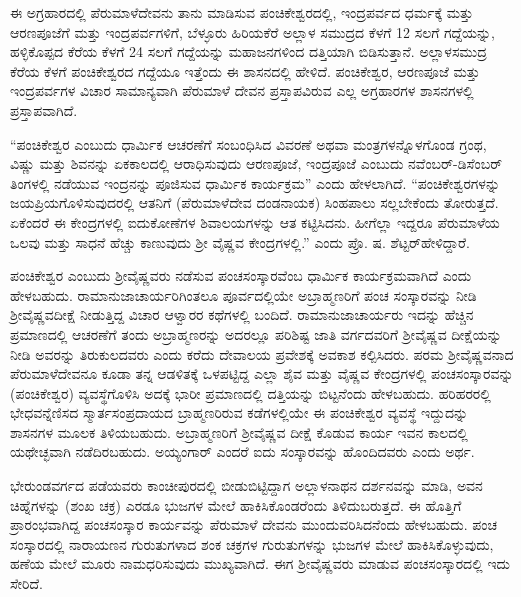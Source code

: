 ಈ ಅಗ್ರಹಾರದಲ್ಲಿ ಪೆರುಮಾಳೆದೇವನು ತಾನು ಮಾಡಿಸುವ ಪಂಚಿಕೇಶ್ವರದಲ್ಲಿ, ಇಂದ್ರಪರ್ವದ ಧರ್ಮಕ್ಕೆ ಮತ್ತು ಆರಣಪೂಜೆಗೆ ಮತ್ತು ಇಂದ್ರಪರ್ವಗಳಿಗೆ, ಬೆಳ್ಳೂರು ಹಿರಿಯಕೆರೆ ಅಲ್ಲಾಳ ಸಮುದ್ರದ ಕೆಳಗೆ 12 ಸಲಗೆ ಗದ್ದೆಯನ್ನು, ಹಳ್ಳಿಕೊಪ್ಪದ ಕೆರೆಯ ಕೆಳಗೆ 24 ಸಲಗೆ ಗದ್ದೆಯನ್ನು ಮಹಾಜನಗಳಿಂದ ದತ್ತಿಯಾಗಿ ಬಿಡಿಸುತ್ತಾನೆ. ಅಲ್ಲಾಳಸಮುದ್ರ ಕೆರೆಯ ಕೆಳಗೆ ಪಂಚಿಕೇಶ್ವರದ ಗದ್ದೆಯೂ ಇತ್ತೆಂದು ಈ ಶಾಸನದಲ್ಲಿ ಹೇಳಿದೆ. ಪಂಚಿಕೇಶ್ವರ, ಆರಣಪೂಜೆ ಮತ್ತು ಇಂದ್ರಪರ್ವಗಳ ವಿಚಾರ ಸಾಮಾನ್ಯವಾಗಿ ಪೆರುಮಾಳೆ ದೇವನ ಪ್ರಸ್ತಾಪವಿರುವ ಎಲ್ಲ ಅಗ್ರಹಾರಗಳ ಶಾಸನಗಳಲ್ಲಿ ಪ್ರಸ್ತಾಪವಾಗಿದೆ.

“ಪಂಚಿಕೇಶ್ವರ ಎಂಬುದು ಧಾರ್ಮಿಕ ಆಚರಣೆಗೆ ಸಂಬಂಧಿಸಿದ ವಿವರಣೆ ಅಥವಾ ಮಂತ್ರಗಳನ್ನೊಳಗೊಂಡ ಗ್ರಂಥ, ವಿಷ್ಣು ಮತ್ತು ಶಿವನನ್ನು ಏಕಕಾಲದಲ್ಲಿ ಆರಾಧಿಸುವುದು ಆರಣಪೂಜೆ, ಇಂದ್ರಪೂಜೆ ಎಂಬುದು ನವೆಂಬರ್​-ಡಿಸೆಂಬರ್​ ತಿಂಗಳಲ್ಲಿ ನಡೆಯುವ ಇಂದ್ರನನ್ನು ಪೂಜಿಸುವ ಧಾರ್ಮಿಕ ಕಾರ್ಯಕ್ರಮ” ಎಂದು ಹೇಳಲಾಗಿದೆ. “ಪಂಚಿಕೇಶ್ವರಗಳನ್ನು ಜಯಪ್ರಿಯಗೊಳಿಸುವುದರಲ್ಲಿ ಆತನಿಗೆ (ಪೆರುಮಾಳೆದೇವ ದಂಡನಾಯಕ) ಸಿಂಹಪಾಲು ಸಲ್ಲಬೇಕೆಂದು ತೋರುತ್ತದೆ. ಏಕೆಂದರೆ ಈ ಕೇಂದ್ರಗಳಲ್ಲಿ ಐದುಕೋಣೆಗಳ ಶಿವಾಲಯಗಳನ್ನು ಆತ ಕಟ್ಟಿಸಿದನು. ಹೀಗೆಲ್ಲಾ ಇದ್ದರೂ ಪೆರುಮಾಳೆಯ ಒಲವು ಮತ್ತು ಸಾಧನೆ ಹೆಚ್ಚು ಕಾಣುವುದು ಶ‍್ರೀ ವೈಷ್ಣವ ಕೇಂದ್ರಗಳಲ್ಲಿ.” ಎಂದು ಪ್ರೊ. ಷ. ಶೆಟ್ಟರ್​ ಹೇಳಿದ್ದಾರೆ.

ಪಂಚಿಕೇಶ್ವರ ಎಂಬುದು ಶ‍್ರೀವೈಷ್ಣವರು ನಡೆಸುವ ಪಂಚಸಂಸ್ಕಾರವೆಂಬ ಧಾರ್ಮಿಕ ಕಾರ್ಯಕ್ರಮವಾಗಿದೆ ಎಂದು ಹೇಳಬಹುದು. ರಾಮಾನುಜಾಚಾರ್ಯರಿಗಿಂತಲೂ ಪೂರ್ವದಲ್ಲಿಯೇ ಅಬ್ರಾಹ್ಮಣರಿಗೆ ಪಂಚ ಸಂಸ್ಕಾರವನ್ನು ನೀಡಿ ಶ‍್ರೀವೈಷ್ಣವದೀಕ್ಷೆ ನೀಡುತ್ತಿದ್ದ ವಿಚಾರ ಆಳ್ವಾರರ ಕಥೆಗಳಲ್ಲಿ ಬಂದಿದೆ. ರಾಮಾನುಜಾಚಾರ್ಯರು ಇದನ್ನು ಹೆಚ್ಚಿನ ಪ್ರಮಾಣದಲ್ಲಿ ಆಚರಣೆಗೆ ತಂದು ಅಬ್ರಾಹ್ಮಣರನ್ನು ಅದರಲ್ಲೂ ಪರಿಶಿಷ್ಟ ಜಾತಿ ವರ್ಗದವರಿಗೆ ಶ‍್ರೀವೈಷ್ಣವ ದೀಕ್ಷೆಯನ್ನು ನೀಡಿ ಅವರನ್ನು ತಿರುಕುಲದವರು ಎಂದು ಕರೆದು ದೇವಾಲಯ ಪ್ರವೇಶಕ್ಕೆ ಅವಕಾಶ ಕಲ್ಪಿಸಿದರು. ಪರಮ ಶ‍್ರೀವೈಷ್ಣವನಾದ ಪೆರುಮಾಳೆದೇವನೂ ಕೂಡಾ ತನ್ನ ಆಡಳಿತಕ್ಕೆ ಒಳಪಟ್ಟಿದ್ದ ಎಲ್ಲಾ ಶೈವ ಮತ್ತು ವೈಷ್ಣವ ಕೇಂದ್ರಗಳಲ್ಲಿ ಪಂಚಸಂಸ್ಕಾರವನ್ನು (ಪಂಚಿಕೇಶ್ವರ) ವ್ಯವಸ್ಥೆಗೊಳಿಸಿ ಅದಕ್ಕೆ ಭಾರೀ ಪ್ರಮಾಣದಲ್ಲಿ ದತ್ತಿಯನ್ನು ಬಿಟ್ಟನೆಂದು ಹೇಳಬಹುದು. ಹರಿಹರರಲ್ಲಿ ಭೇಧವನ್ನೆಣಿಸದ ಸ್ಮಾರ್ತಸಂಪ್ರದಾಯದ ಬ್ರಾಹ್ಮಣರಿರುವ ಕಡೆಗಳಲ್ಲಿಯೇ ಈ ಪಂಚಿಕೇಶ್ವರ ವ್ಯವಸ್ಥೆ ಇದ್ದುದನ್ನು ಶಾಸನಗಳ ಮೂಲಕ ತಿಳಿಯಬಹುದು. ಅಬ್ರಾಹ್ಮಣರಿಗೆ ಶ‍್ರೀವೈಷ್ಣವ ದೀಕ್ಷೆ ಕೊಡುವ ಕಾರ್ಯ ಇವನ ಕಾಲದಲ್ಲಿ ಯಥೇಚ್ಛವಾಗಿ ನಡೆದಿರಬಹುದು. ಅಯ್ಯಂಗಾರ್​ ಎಂದರೆ ಐದು ಸಂಸ್ಕಾರವನ್ನು ಹೊಂದಿದವರು ಎಂದು ಅರ್ಥ.

ಭೇರುಂಡವರ್ಗದ ಪಡೆಯವರು ಕಾಂಚೀಪುರದಲ್ಲಿ ಬೀಡುಬಿಟ್ಟಿದ್ದಾಗ ಅಲ್ಲಾಳನಾಥನ ದರ್ಶನವನ್ನು ಮಾಡಿ, ಅವನ ಚಿಹ್ನೆಗಳನ್ನು (ಶಂಖ ಚಕ್ರ) ಎರಡೂ ಭುಜಗಳ ಮೇಲೆ ಹಾಕಿಸಿಕೊಂಡರೆಂದು ತಿಳಿದುಬರುತ್ತದೆ. ಈ ಹೊತ್ತಿಗೆ ಪ್ರಾರಂಭವಾಗಿದ್ದ ಪಂಚಸಂಸ್ಕಾರ ಕಾರ್ಯವನ್ನು ಪೆರುಮಾಳೆ ದೇವನು ಮುಂದುವರಿಸಿದನೆಂದು ಹೇಳಬಹುದು. ಪಂಚ ಸಂಸ್ಕಾರದಲ್ಲಿ ನಾರಾಯಣನ ಗುರುತುಗಳಾದ ಶಂಕ ಚಕ್ರಗಳ ಗುರುತುಗಳನ್ನು ಭುಜಗಳ ಮೇಲೆ ಹಾಕಿಸಿಕೊಳ್ಳುವುದು, ಹಣೆಯ ಮೇಲೆ ಮೂರು ನಾಮಧರಿಸುವುದು ಮುಖ್ಯವಾಗಿದೆ. ಈಗ ಶ‍್ರೀವೈಷ್ಣವರು ಮಾಡುವ ಪಂಚಸಂಸ್ಕಾರದಲ್ಲಿ ಇದು ಸೇರಿದೆ.

